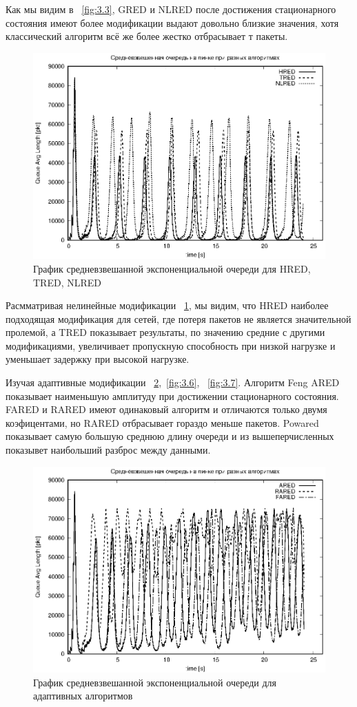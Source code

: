 Как мы видим в ~\ref{fig:3.3}, GRED и NLRED после достижения стационарного состояния имеют более модификации выдают довольно близкие значения, хотя классический алгоритм всё же более жестко отбрасывает т пакеты.

\begin{figure}[!ht]
  \centering
  \includegraphics[width=0.7\linewidth]{image/av_queues_HTNl.eps}
  \caption{График средневзвешанной экспоненциальной очереди для HRED, TRED, NLRED}
  \label{fig:3.4}
\end{figure}

Расмматривая нелинейные модификации ~\ref{fig:3.4}, мы видим, что HRED наиболее подходящая модификация для сетей, где потеря пакетов не является значительной пролемой, а TRED показывает результаты, по значению средние с другими модификациями, увеличивает пропускную способность при
низкой нагрузке и уменьшает задержку при высокой нагрузке.  

Изучая адаптивные модификации ~\ref{fig:3.5},~\ref{fig:3.6}, ~\ref{fig:3.7}. Алгоритм Feng ARED показывает наименьшую амплитуду при достижении стационарного состояния. FARED и RARED имеют одинаковый алгоритм и отличаются только двумя коэфицентами, но RARED отбрасывает гораздо меньше пакетов. Powared показывает самую большую среднюю длину очереди и из вышеперчисленных показывет наибольший разброс между данными.


\begin{figure}[!ht]
  \centering
  \includegraphics[width=0.7\linewidth]{image/av_queues_adaptive1.eps}
  \caption{График средневзвешанной экспоненциальной очереди для адаптивных алгоритмов}
  \label{fig:3.5}
\end{figure}

